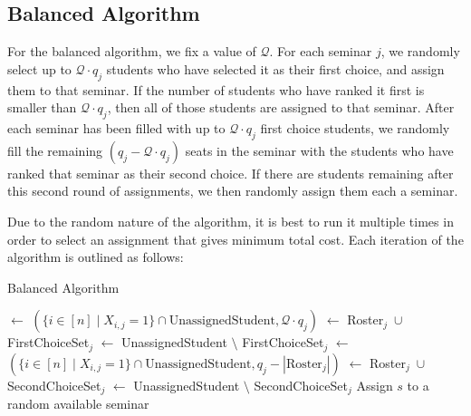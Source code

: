 \documentclass{article} %
\begin{document}
\subsection{Balanced Algorithm}
    \par\qquad For the balanced algorithm, we fix a value of $\mathcal{Q}$. For each seminar $j$, we randomly select up to $\mathcal{Q}\cdot q_j$ students who have selected it as their first choice, and assign them to that seminar. If the number of students who have ranked it first is smaller than $\mathcal{Q}\cdot q_j$, then all of those students are assigned to that seminar. After each seminar has been filled with up to $\mathcal{Q}\cdot q_j$ first choice students, we randomly fill the remaining $(q_j - \mathcal{Q}\cdot q_j)$ seats in the seminar with the students who have ranked that seminar as their second choice. If there are students remaining after this second round of assignments, we then randomly assign them each a seminar.
    \par\qquad Due to the random nature of the algorithm, it is best to run it multiple times in order to select an assignment that gives minimum total cost. Each iteration of the algorithm is outlined as follows:
    \begin{algorithm}
        \caption{Balanced Algorithm}
        \begin{algorithmic}
                 $\gets$ $\left(\{i\in[n] \mid X_{i,j}=1 \} \cap \text{UnassignedStudent}, \mathcal{Q}\cdot q_j\right)$
                 $\gets$ Roster$_j\;\cup$ FirstChoiceSet$_j$
                 $\gets$ UnassignedStudent $\setminus$ FirstChoiceSet$_j$
            \EndFor
                 $\gets$ $\left(\{i\in[n] \mid X_{i,j}=1 \} \cap \text{UnassignedStudent}, q_j - |\text{Roster$_j$}|\right)$
                 $\gets$ Roster$_j\;\cup$ SecondChoiceSet$_j$
                 $\gets$ UnassignedStudent $\setminus$ SecondChoiceSet$_j$
            \EndFor
                \State Assign $s$ to a random available seminar
            \EndFor
        \end{algorithmic}
    \end{algorithm}
\end{document}
